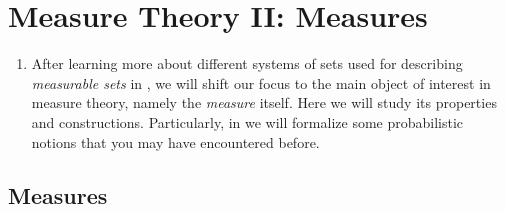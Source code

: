 \section{Measure Theory II: Measures}
\label{sect:measures}
\begin{enumerate}
\item After learning more about different systems of sets used for describing
\emph{measurable sets} in , we will shift our
focus to the main object of interest in measure theory, namely the
\emph{measure} itself. Here we will study its properties and constructions.
Particularly, in  we will formalize some probabilistic
notions that you may have encountered before.
\end{enumerate}
\subsection{Measures}
